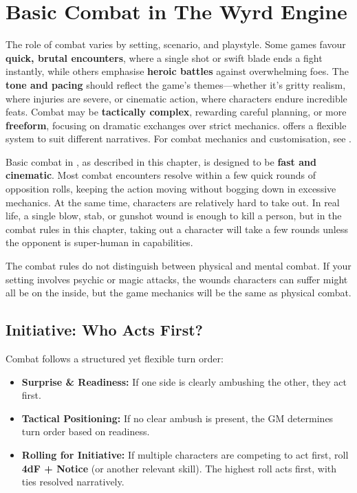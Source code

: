 \section{Basic Combat in The Wyrd Engine}

The role of combat varies by setting, scenario, and playstyle. Some games favour \textbf{quick, brutal encounters}, where a single shot or swift blade ends a fight instantly, while others emphasise \textbf{heroic battles} against overwhelming foes. The \textbf{tone and pacing} should reflect the game's themes—whether it’s gritty realism, where injuries are severe, or cinematic action, where characters endure incredible feats. Combat may be \textbf{tactically complex}, rewarding careful planning, or more \textbf{freeform}, focusing on dramatic exchanges over strict mechanics. \wyrd offers a flexible system to suit different narratives. For combat mechanics and customisation, see .

Basic combat in \wyrd, as described in this chapter, is designed to be \textbf{fast and cinematic}. Most combat encounters resolve within a few quick rounds of opposition rolls, keeping the action moving without bogging down in excessive mechanics. At the same time, characters are relatively hard to take out. In real life, a single blow, stab, or gunshot wound is enough to kill a person, but in the combat rules in this chapter, taking out a character will take a few rounds unless the opponent is super-human in capabilities.

The combat rules do not distinguish between physical and mental combat. If your setting involves psychic or magic attacks, the wounds characters can suffer might all be on the inside, but the game mechanics will be the same as physical combat.

\subsection{Initiative: Who Acts First?}

Combat follows a structured yet flexible turn order:

\begin{Example}
	\begin{itemize}
    	\item \textbf{Surprise \& Readiness:} If one side is clearly ambushing the other, they act first.
	    \item \textbf{Tactical Positioning:} If no clear ambush is present, the GM determines turn order based on readiness.
	    \item \textbf{Rolling for Initiative:} If multiple characters are competing to act first, roll \textbf{4dF + Notice} (or another relevant skill). The highest roll acts first, with ties resolved narratively.
	\end{itemize}
\end{Example}

